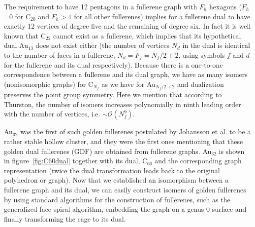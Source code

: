The requirement to have 12 pentagons in a fullerene graph with $F_h$ hexagons
($F_h$=0 for C$_{20}$ and $F_h > 1$ for all other fullerenes) implies for a
fullerene dual to have exactly 12 vertices of degree five and the remaining of
degree six. In fact it is well known that C$_{22}$ cannot exist as a
fullerene,\autocite{Grunbaum_numberhexagonssimplicity_1963} which implies that
its hypothetical dual Au$_{13}$ does not exist either (the number of vertices
$N_d$ in the dual is identical to the number of faces in a fullerene,
$N_d=F_f=N_f/2+2$,\autocite{Schwerdtfeger_topologyfullerenes_2015} using
symbols $f$ and $d$ for the fullerene and its dual respectively). Because there
is a one-to-one correspondence between a fullerene and its dual graph, we have
as many isomers (nonisomorphic graphs) for C$_{N_f}$ as we have for
Au$_{N_f/2+2}$ and dualization preserves the point group symmetry. Here we
mention that according to Thurston, the number of isomers increases
polynomially in ninth leading order with the number of vertices, i.e.
$\sim\mathcal{O}({N_f^9})$.\autocite{Thurston_Shapespolyhedratriangulations_1998} 

Au$_{32}$ was the first of such golden fullerenes postulated by Johansson et
al. to be a rather stable hollow cluster, and they were the first ones
mentioning that these golden dual fullerenes (GDF) are obtained from fullerene
graphs.\autocite{Johansson_Au3224CaratGolden_2004} Au$_{32}$ is shown in
figure~\ref{fig:C60dual} together with its dual, C$_{60}$ and the corresponding
graph representation (twice the dual transformation leads back to the original
polyhedron or graph). Now that we established an isomorphism between a
fullerene graph and its dual, we can easily construct isomers of golden
fullerenes by using standard algorithms for the construction of fullerenes,
such as the generalized face-spiral
algorithm,\autocite{Fowler-atlas-2006,Schwerdtfeger_Programfullerenesoftware_2013,Wirz-2014,Schwerdtfeger_topologyfullerenes_2015}
embedding the graph on a genus 0 surface and finally transforming the cage to
its dual.

